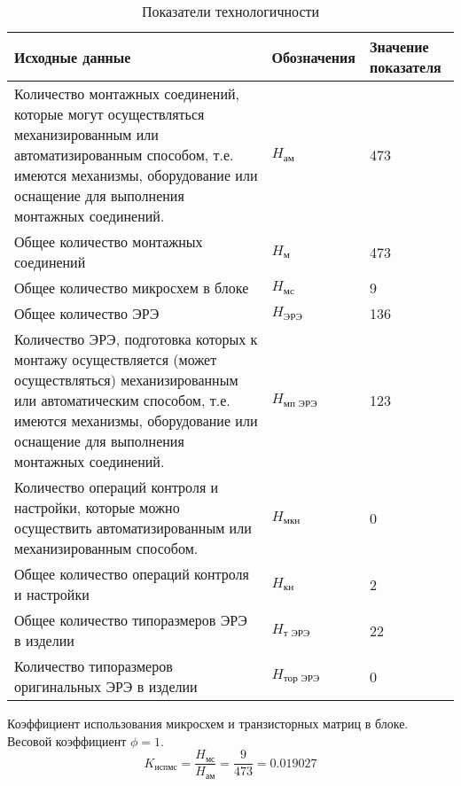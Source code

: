 \begin{table}
    \centering
    \begin{tabu}{|X[l,m]|X[-1,c,m]|X[-1,c,m]|} \hline
        Исходные данные & Обозначения & Значение \newline показателя \\ \hline
        Количество монтажных соединений, которые могут осуществляться
        механизированным или автоматизированным способом,
        т.е. имеются механизмы, оборудование или оснащение для
        выполнения монтажных соединений.
        & $H_{\text{ам}}$ & 473  \\ \hline
        Общее количество монтажных соединений
        & $H_{\text{м}}$ & 473  \\ \hline
        Общее количество микросхем в блоке & $H_{\text{мс}}$ & 9  \\ \hline
        Общее количество ЭРЭ & $H_{\text{ЭРЭ}}$ & 136  \\ \hline
        Количество ЭРЭ, подготовка которых к монтажу осуществляется (может
        осуществляться) механизированным или автоматическим способом,
        т.е. имеются механизмы, оборудование или оснащение для выполнения
        монтажных соединений.
        & $H_{\text{мп ЭРЭ}}$ & 123  \\ \hline
        Количество операций контроля и настройки, которые можно осуществить
        автоматизированным или механизированным способом.
        & $H_{\text{мкн}}$ & 0  \\ \hline
        Общее количество операций контроля и настройки
        & $H_{\text{кн}}$ & 2  \\ \hline
        Общее количество типоразмеров ЭРЭ в изделии
        & $H_{\text{т ЭРЭ}}$ & 22  \\ \hline
        Количество типоразмеров оригинальных ЭРЭ в изделии
        & $H_{\text{тор ЭРЭ}}$ & 0  \\ \hline
    \end{tabu}
    \caption{Показатели технологичности}
    \label{technological_estaime_parametres}
\end{table}

Коэффициент использования микросхем и транзисторных матриц в блоке.
Весовой коэффициент $\phi = 1$.
$$
K_{\text{испмс}}
    = \frac{H_\text{мс}}
           {H_\text{ам}}
    = \frac{9}{473}
    = 0.019027
$$

